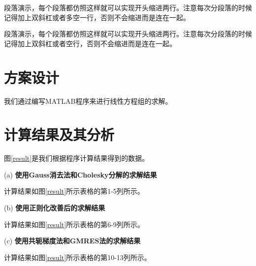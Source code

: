 \documentclass[UTF8,twoside,zihao=-4,AutoFakeBold,scheme=chinese,openany]{ctexart}
\begin{document}
\setlength{\parindent}{2em}段落演示，每个段落都仿照这样就可以实现开头缩进两行。注意每次分段落的时候记得加上双斜杠或者多空一行，否则不会缩进而是连在一起。

\setlength{\parindent}{2em}段落演示，每个段落都仿照这样就可以实现开头缩进两行。注意每次分段落的时候记得加上双斜杠或者空行，否则不会缩进而是连在一起。\\



\section{方案设计}
\setlength{\parindent}{2em}我们通过编写MATLAB程序来进行线性方程组的求解。  


\section{计算结果及其分析}

\setlength{\parindent}{2em}图\ref{result}是我们根据程序计算结果得到的数据。

(a) \textbf{使用Gauss消去法和Cholesky分解的求解结果}

\setlength{\parindent}{2em}计算结果如图\ref{result}所示表格的第1-5列所示。

(b) \textbf{使用正则化改善后的求解结果}

\setlength{\parindent}{2em}计算结果如图\ref{result}所示表格的第6-9列所示。

(c) \textbf{使用共轭梯度法和GMRES法的求解结果} 

\setlength{\parindent}{2em}计算结果如图\ref{result}所示表格的第10-13列所示。\\
\end{document}
